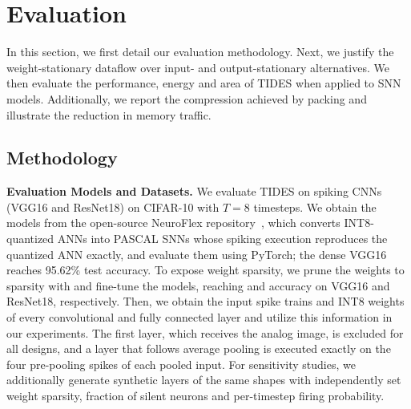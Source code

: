 \section{Evaluation}
\label{sec:eval}

In this section, we first detail our evaluation methodology. Next, we justify the weight-stationary
dataflow over input- and output-stationary alternatives. We then evaluate the performance, energy and
area of TIDES when applied to SNN models. Additionally, we report the compression achieved by packing
and illustrate the reduction in memory traffic.

\subsection{Methodology}
\label{sec:method}

\textbf{Evaluation Models and Datasets.} We evaluate TIDES on spiking CNNs (VGG16 and ResNet18) on
CIFAR-10 with $T=8$ timesteps. We obtain the models from the open-source NeuroFlex
repository~\cite{neuroflex}, which converts INT8-quantized ANNs into PASCAL SNNs whose spiking execution
reproduces the quantized ANN exactly, and evaluate them using PyTorch; the dense VGG16 reaches 95.62\%
test accuracy. To expose weight sparsity, we prune the weights to  sparsity with
 and fine-tune the models, reaching \tbd{--} and \tbd{--} accuracy on VGG16 and
ResNet18, respectively. Then, we obtain the input spike trains and INT8 weights of every convolutional
and fully connected layer and utilize this information in our experiments. The first layer, which
receives the analog image, is excluded for all designs, and a layer that follows average pooling is
executed exactly on the four pre-pooling spikes of each pooled input. For sensitivity studies, we
additionally generate synthetic layers of the same shapes with independently set weight sparsity,
fraction of silent neurons and per-timestep firing probability.

